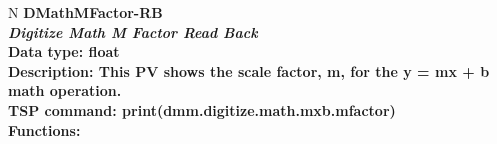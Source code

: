 \documentclass[openany]{article}
\begin{document}
		\begin{tabular}{N}
			\hline
			\bfseries DMathMFactor-RB\label{pv:dmathmfactor-rb} \\ \hline
			\emph{Digitize Math M Factor Read Back} \\
			Data type: float \\
			Description: This PV shows the scale factor, m, for the y = mx + b math operation. \\
			TSP command: print(dmm.digitize.math.mxb.mfactor) \\
			Functions: \\
			\arrayrulecolor{\FuncTableBorderColor}

		\end{tabular}
\end{document}
